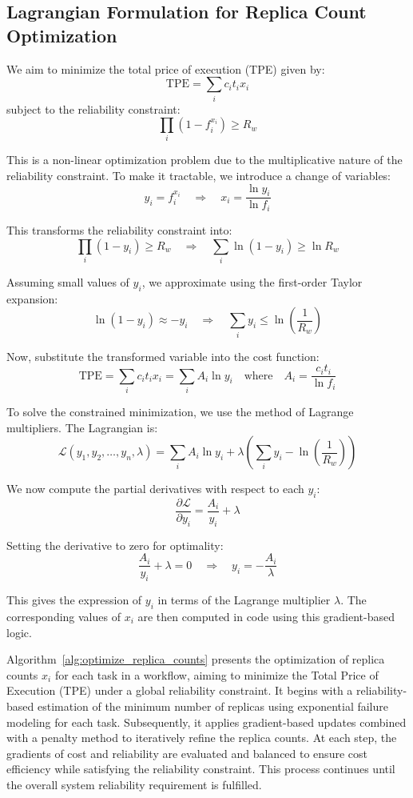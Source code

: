 \documentclass[12pt]{tcc}
\begin{document}
\subsection*{Lagrangian Formulation for Replica Count Optimization}

We aim to minimize the total price of execution (TPE) given by:
\[
\text{TPE} = \sum_{i} c_i t_i x_i
\]
subject to the reliability constraint:
\[
\prod_{i} (1 - f_i^{x_i}) \geq R_w
\]

This is a non-linear optimization problem due to the multiplicative nature of the reliability constraint. To make it tractable, we introduce a change of variables:
\[
y_i = f_i^{x_i} \quad \Rightarrow \quad x_i = \frac{\ln y_i}{\ln f_i}
\]

This transforms the reliability constraint into:
\[
\prod_i (1 - y_i) \geq R_w \quad \Rightarrow \quad \sum_i \ln(1 - y_i) \geq \ln R_w
\]

Assuming small values of \( y_i \), we approximate using the first-order Taylor expansion:
\[
\ln(1 - y_i) \approx -y_i \quad \Rightarrow \quad \sum_i y_i \leq \ln\left(\frac{1}{R_w}\right)
\]

Now, substitute the transformed variable into the cost function:
\[
\text{TPE} = \sum_i c_i t_i x_i = \sum_i A_i \ln y_i \quad \text{where} \quad A_i = \frac{c_i t_i}{\ln f_i}
\]

To solve the constrained minimization, we use the method of Lagrange multipliers. The Lagrangian is:
\[
\mathcal{L}(y_1, y_2, \dots, y_n, \lambda) = \sum_i A_i \ln y_i + \lambda \left( \sum_i y_i - \ln\left(\frac{1}{R_w}\right) \right)
\]

We now compute the partial derivatives with respect to each \( y_i \):
\[
\frac{\partial \mathcal{L}}{\partial y_i} = \frac{A_i}{y_i} + \lambda
\]

Setting the derivative to zero for optimality:
\[
\frac{A_i}{y_i} + \lambda = 0 \quad \Rightarrow \quad y_i = -\frac{A_i}{\lambda}
\]

This gives the expression of \( y_i \) in terms of the Lagrange multiplier \( \lambda \). The corresponding values of \( x_i \) are then computed in code using this gradient-based logic.

Algorithm~\ref{alg:optimize_replica_counts} presents the optimization of replica counts \( x_i \) for each task in a workflow, aiming to minimize the Total Price of Execution (TPE) under a global reliability constraint. It begins with a reliability-based estimation of the minimum number of replicas using exponential failure modeling for each task. Subsequently, it applies gradient-based updates combined with a penalty method to iteratively refine the replica counts. At each step, the gradients of cost and reliability are evaluated and balanced to ensure cost efficiency while satisfying the reliability constraint. This process continues until the overall system reliability requirement is fulfilled.
\end{document}
